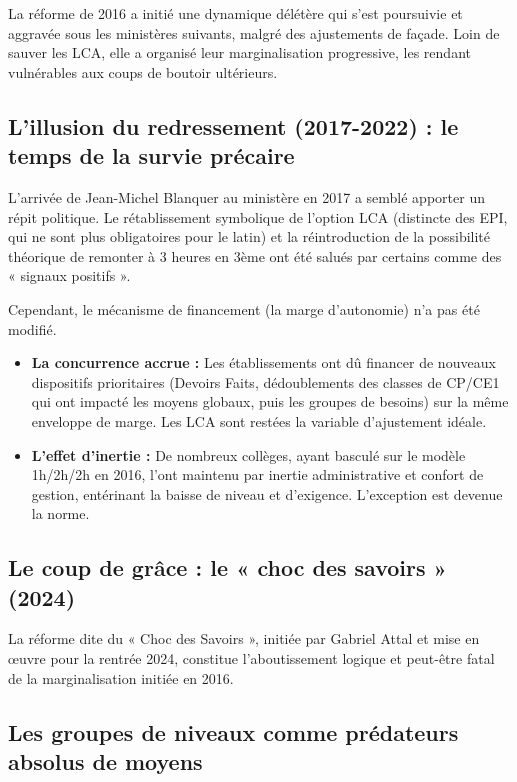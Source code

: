 La réforme de 2016 a initié une dynamique délétère qui s'est poursuivie et aggravée sous les
ministères suivants, malgré des ajustements de façade. Loin de sauver les LCA, elle a organisé leur
marginalisation progressive, les rendant vulnérables aux coups de boutoir ultérieurs.



\subsection{L'illusion du redressement (2017-2022) : le temps de la survie précaire}

L'arrivée de Jean-Michel Blanquer au ministère en 2017 a semblé apporter un répit politique. Le
rétablissement symbolique de l'option LCA (distincte des EPI, qui ne sont plus obligatoires pour le
latin) et la réintroduction de la possibilité théorique de remonter à 3 heures en 3ème ont été
salués par certains comme des « signaux positifs ».\cite{I-3-2-ref1}

Cependant, le mécanisme de financement (la marge d'autonomie) n'a pas été modifié.

\begin{itemize}\item \textbf{La concurrence accrue :} Les établissements ont dû financer de nouveaux dispositifs prioritaires (Devoirs Faits, dédoublements des classes de CP/CE1 qui ont impacté les moyens globaux, puis les groupes de besoins) sur la même enveloppe de marge. Les LCA sont restées la variable d'ajustement idéale.\item \textbf{L'effet d'inertie :} De nombreux collèges, ayant basculé sur le modèle 1h/2h/2h en 2016, l'ont maintenu par inertie administrative et confort de gestion, entérinant la baisse de niveau et d'exigence.\cite{I-3-2-ref1} L'exception est devenue la norme.\end{itemize}

\subsection{Le coup de grâce : le « choc des savoirs » (2024)}

La réforme dite du « Choc des Savoirs », initiée par Gabriel Attal et mise en œuvre pour la rentrée
2024, constitue l'aboutissement logique et peut-être fatal de la marginalisation initiée en
2016.\cite{I-3-2-ref2}



\subsection{Les groupes de niveaux comme prédateurs absolus de moyens}


